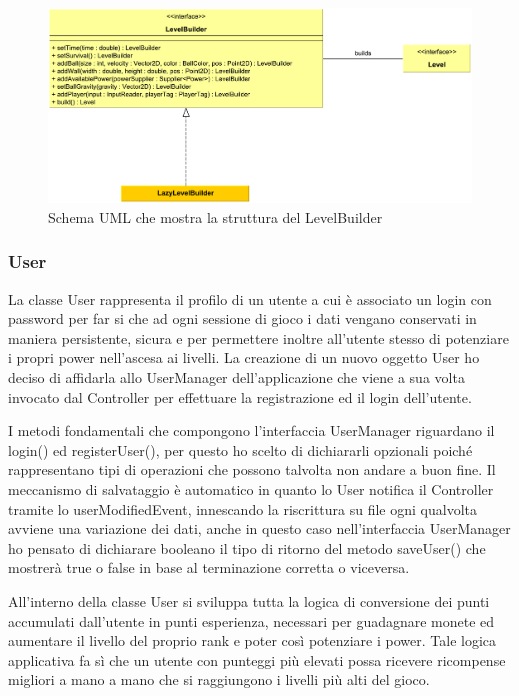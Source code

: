 \documentclass[a4paper,12pt]{report}
\begin{document}
\begin{figure}[H]
\includegraphics[width=\linewidth]{img/levelbuilder}
\caption{Schema UML che mostra la struttura del LevelBuilder}
\label{img:builder}
\end{figure}

\subsubsection*{User}
La classe User rappresenta il profilo di un utente a cui è associato un login con password per far si che ad ogni sessione di gioco i dati vengano conservati in maniera persistente, sicura e per permettere inoltre all'utente stesso di potenziare i propri power nell'ascesa ai livelli.
La creazione di un nuovo oggetto User ho deciso di affidarla allo UserManager dell'applicazione che viene a sua volta invocato dal Controller per effettuare la registrazione ed il login dell'utente.

I metodi fondamentali che compongono l'interfaccia UserManager riguardano il login() ed registerUser(), per questo ho scelto di dichiararli opzionali poiché rappresentano tipi di operazioni che possono talvolta non andare a buon fine. 
Il meccanismo di salvataggio è automatico in quanto lo User notifica il Controller tramite lo userModifiedEvent, innescando la riscrittura su file ogni qualvolta avviene una variazione dei dati, anche in questo caso nell'interfaccia UserManager ho pensato di dichiarare booleano il tipo di ritorno del metodo saveUser() che mostrerà true o false in base al terminazione corretta o viceversa.

All'interno della classe User si sviluppa tutta la logica di conversione dei punti accumulati dall'utente in punti esperienza, necessari per guadagnare monete ed aumentare il livello del proprio rank e poter così potenziare i power. Tale logica applicativa fa sì che un utente con punteggi più elevati possa ricevere ricompense migliori a mano a mano che si raggiungono i livelli più alti del gioco.
\end{document}
